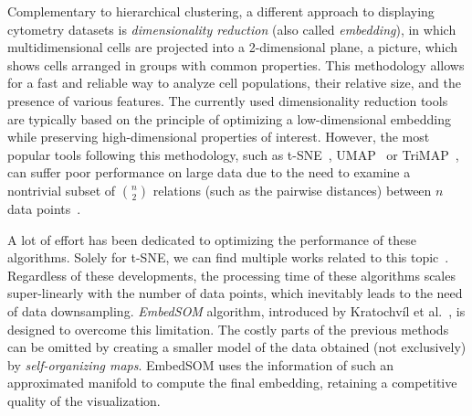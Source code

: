 

Complementary to hierarchical clustering, a different approach to displaying cytometry datasets is \emph{dimensionality reduction} (also called \emph{embedding}), in which multidimensional cells are projected into a 2-dimensional plane, a picture, which shows cells arranged in groups with common properties. This methodology allows for a fast and reliable way to analyze cell populations, their relative size, and the presence of various features. The currently used dimensionality reduction tools are typically based on the principle of optimizing a low-dimensional embedding while preserving high-dimensional properties of interest. However, the most popular tools following this methodology, such as t-SNE~\cite{maaten2008visualizing}, UMAP~\cite{becht2019dimensionality} or TriMAP~\cite{amid2019trimap}, can suffer poor performance on large data due to the need to examine a nontrivial subset of $\binom{n}{2}$ relations (such as the pairwise distances) between $n$ data points~\cite{kratochvil2019generalized}.

A lot of effort has been dedicated to optimizing the performance of these algorithms. Solely for t-SNE, we can find multiple works related to this topic~\cite{pezzotti2016hierarchical,pezzotti2016approximated,linderman2017efficient,belkina2018automated}. Regardless of these developments, the processing time of these algorithms scales super-linearly with the number of data points, which inevitably leads to the need of data downsampling. \emph{EmbedSOM} algorithm, introduced by Kratochvíl et al.~\cite{kratochvil2019generalized}, is designed to overcome this limitation. The costly parts of the previous methods can be omitted by creating a smaller model of the data obtained (not exclusively) by \emph{self-organizing maps}. EmbedSOM uses the information of such an approximated manifold to compute the final embedding, retaining a competitive quality of the visualization.

